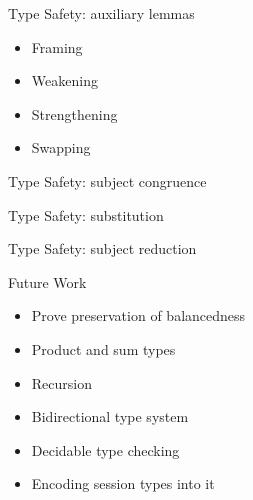 \documentclass[dvipsnames, notes]{beamer}
\begin{document}

  \begin{frame}{Type Safety: auxiliary lemmas}
    \begin{itemize}
      \item Framing
      \item Weakening
      \item Strengthening
      \item Swapping
    \end{itemize}
  \end{frame}

  \begin{frame}{Type Safety: subject congruence}
  \end{frame}

  \begin{frame}{Type Safety: substitution}
  \end{frame}

  \begin{frame}{Type Safety: subject reduction}
  \end{frame}

  \begin{frame}{Future Work}
    \begin{itemize}
    \item Prove preservation of balancedness
    \item Product and sum types
    \item Recursion
    \item Bidirectional type system
    \item Decidable type checking
    \item Encoding session types into it
    \end{itemize}
  \end{frame}
\end{document}
